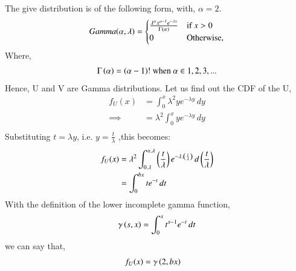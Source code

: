 \documentclass[journal,12pt,twocolumn]{IEEEtran}
\theoremstyle{remark}
\begin{document}
%

\solution 
The give distribution is of the following form, with, $\alpha = 2$. 
\begin{align}
Gamma(\alpha,\lambda) = 
\begin{cases}
\frac{\lambda^{\alpha}x^{\alpha-1}e^{-\lambda x}}{\Gamma\left(\alpha\right)} & \text{if } x > 0\\
0 & \text{Otherwise,}
\end{cases} 
\end{align}
Where, 
\begin{align}
\Gamma\left(\alpha\right) = \left(\alpha - 1\right)! \text{ when } \alpha \in {1,2,3,...}
\end{align}
Hence, U and V are Gamma distributions. Let us find out the CDF of the U,
\begin{align}
f_{U}(x) %
 &= \int_{0}^{x} \lambda^{2}ye^{-\lambda y} \, dy\\
\implies &= \lambda^{2} \int_{0}^{x} ye^{-\lambda y} \, dy\\						
\end{align}
Substituting $t = \lambda y$, i.e. $y= \frac{t}{\lambda}$ ,this becomes:
\begin{align}
f_{U}(x) &= \lambda^{2} \int_{0.\lambda}^{x.\lambda} \left(\frac{t}{\lambda}\right) e^{-\lambda.\left(\frac{t}{\lambda}\right)} \, d\left(\frac{t}{\lambda}\right)\\
&= \int_{0}^{bx} t e^{-t} \,dt\\
\end{align}
With the definition of the lower incomplete gamma function,
\begin{align}
\gamma \left(s,x\right) = \int_{0}^{x} t^{s-1}e^{-t} \, dt\\
\end{align}
we can say that,
\begin{align}
f_{U}(x) &= \gamma \left(2,bx\right)
\end{align}
\end{document}
